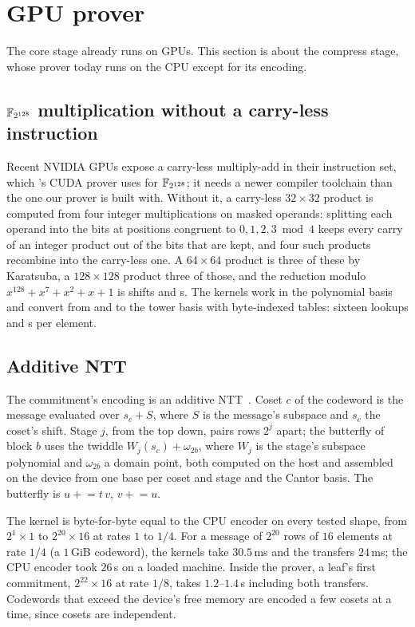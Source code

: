 \section{GPU prover}\label{sec:gpu}

The core stage already runs on GPUs. This section is about the compress stage, whose prover today runs on the CPU except for its encoding.

\subsection{$\mathbb{F}_{2^{128}}$ multiplication without a carry-less instruction}

Recent NVIDIA GPUs expose a carry-less multiply-add in their instruction set, which \Flock{}'s CUDA prover uses for $\mathbb{F}_{2^{128}}$; it needs a newer compiler toolchain than the one our prover is built with. Without it, a carry-less $32\times 32$ product is computed from four integer multiplications on masked operands: splitting each operand into the bits at positions congruent to $0,1,2,3 \bmod 4$ keeps every carry of an integer product out of the bits that are kept, and four such products recombine into the carry-less one. A $64\times 64$ product is three of these by Karatsuba, a $128\times 128$ product three of those, and the reduction modulo $x^{128}+x^7+x^2+x+1$ is shifts and \XOR{}s. The kernels work in the polynomial basis and convert from and to the tower basis with byte-indexed tables: sixteen lookups and \XOR{}s per element.

\subsection{Additive NTT}

The commitment's encoding is an additive NTT~\citep{fri-binius}. Coset $c$ of the codeword is the message evaluated over $s_c + S$, where $S$ is the message's subspace and $s_c$ the coset's shift. Stage $j$, from the top down, pairs rows $2^j$ apart; the butterfly of block $b$ uses the twiddle $W_j(s_c) + \omega_{2b}$, where $W_j$ is the stage's subspace polynomial and $\omega_{2b}$ a domain point, both computed on the host and assembled on the device from one base per coset and stage and the Cantor basis. The butterfly is $u \mathrel{+}= t\,v$, $v \mathrel{+}= u$.

The kernel is byte-for-byte equal to the CPU encoder on every tested shape, from $2^1\times 1$ to $2^{20}\times 16$ at rates $1$ to $1/4$. For a message of $2^{20}$ rows of $16$ elements at rate $1/4$ (a $1$\,GiB codeword), the kernels take $30.5$\,ms and the transfers $24$\,ms; the CPU encoder took $26$\,s on a loaded machine. Inside the prover, a leaf's first commitment, $2^{22}\times 16$ at rate $1/8$, takes $1.2$--$1.4$\,s including both transfers. Codewords that exceed the device's free memory are encoded a few cosets at a time, since cosets are independent.

